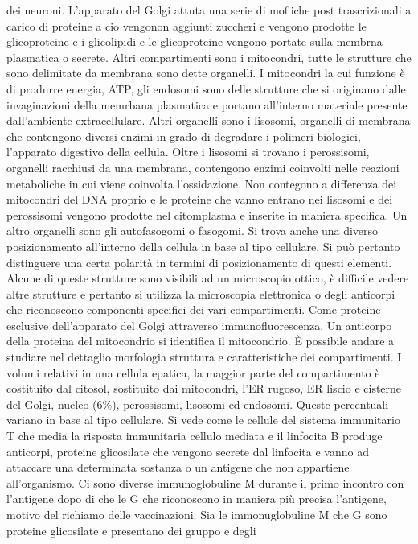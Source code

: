 dei neuroni. L'apparato del Golgi attuta una serie di mofiiche post trascrizionali a carico di proteine a cio vengonon aggiunti zuccheri e vengono prodotte le glicoproteine e i 
glicolipidi e le glicoproteine vengono portate sulla membrna plasmatica o secrete. Altri compartimenti sono i mitocondri, tutte le strutture che sono delimitate da membrana sono 
dette organelli. I mitocondri la cui funzione \`e di produrre energia, ATP, gli endosomi sono delle strutture che si originano dalle invaginazioni della memrbana plasmatica e portano 
all'interno materiale presente dall'ambiente extracellulare. Altri organelli sono i lisosomi, organelli di membrana che contengono diversi enzimi in grado di degradare i polimeri 
biologici, l'apparato digestivo della cellula. Oltre i lisosomi si trovano i perossisomi, organelli racchiusi da una membrana, contengono enzimi coinvolti nelle reazioni metaboliche 
in cui viene coinvolta l'ossidazione. Non contegono a differenza dei mitocondri del DNA proprio e le proteine che vanno entrano nei lisosomi e dei perossisomi vengono prodotte nel 
citomplasma e inserite in maniera specifica. Un altro organelli sono gli autofasogomi o fasogomi. Si trova anche una diverso posizionamento all'interno della cellula in base al tipo 
cellulare. Si pu\`o pertanto distinguere una certa polarit\`a in termini di posizionamento di questi elementi. Alcune di queste strutture sono visibili ad un microscopio ottico, \`e
difficile vedere altre strutture e pertanto si utilizza la microscopia elettronica o degli anticorpi che riconoscono componenti specifici dei vari compartimenti. Come proteine 
esclusive dell'apparato del Golgi attraverso immunofluorescenza. Un anticorpo della proteina del mitocondrio si identifica il mitocondrio. \`E possibile andare a studiare nel dettaglio
morfologia struttura e caratteristiche dei compartimenti. I volumi relativi in una cellula epatica, la maggior parte del compartimento \`e costituito dal citosol, sostituito dai 
mitocondri, l'ER rugoso, ER liscio e cisterne del Golgi, nucleo ($6\%$), perossisomi, lisosomi ed endosomi. Queste percentuali variano in base al tipo cellulare. Si vede come le 
cellule del sistema immunitario T che media la risposta immunitaria cellulo mediata e il linfocita B produge anticorpi, proteine glicosilate che vengono secrete dal linfocita e vanno 
ad attaccare una determinata sostanza o un antigene che non appartiene all'organismo. Ci sono diverse immunoglobuline M durante il primo incontro con l'antigene dopo di che le G che 
riconoscono in maniera pi\`u precisa l'antigene, motivo del richiamo delle vaccinazioni. Sia le immonuglobuline M che G sono proteine glicosilate e presentano dei gruppo e degli 
